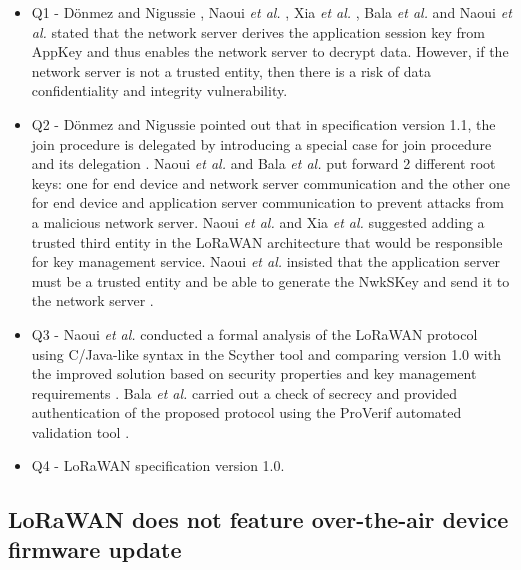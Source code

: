 \documentclass[manuscript,screen,review=false]{acmart}
\begin{document}
\begin{itemize}
\item Q1 - D\"onmez and Nigussie \cite{02_security_procedure_LoRaWANv1.1}, Naoui {\it et al.} \cite{35_third_party_key_management}, Xia {\it et al.} \cite{56_session_key_management}, Bala {\it et al.} \cite{90_separate_session_key_generation} and Naoui {\it et al.} \cite{98_lorawan_framework_smarthome} stated that the network server derives the application session key from AppKey and thus enables the network server to decrypt data. However, if the network server is not a trusted entity, then there is a risk of data confidentiality and integrity vulnerability.

\item Q2 - D\"onmez and Nigussie pointed out that in specification version 1.1, the join procedure is delegated by introducing a special case for join procedure and its delegation \cite{02_security_procedure_LoRaWANv1.1}. Naoui {\it et al.} \cite{35_third_party_key_management} and Bala {\it et al.} \cite{90_separate_session_key_generation} put forward 2 different root keys: one for end device and network server communication and the other one for end device and application server communication to prevent attacks from a malicious network server. Naoui {\it et al.} \cite{35_third_party_key_management} and Xia {\it et al.} \cite{56_session_key_management} suggested adding a trusted third entity in the LoRaWAN architecture that would be responsible for key management service. Naoui {\it et al.} insisted that the application server must be a trusted entity and be able to generate the NwkSKey and send it to the network server \cite{98_lorawan_framework_smarthome}.

\item Q3 - Naoui {\it et al.} conducted a formal analysis of the LoRaWAN protocol using C/Java-like syntax in the Scyther tool and comparing version 1.0 with the improved solution based on security properties and key management requirements \cite{35_third_party_key_management}. Bala {\it et al.} carried out a check of secrecy and provided authentication of the proposed protocol using the ProVerif automated validation tool \cite{90_separate_session_key_generation} .

\item Q4 - LoRaWAN specification version 1.0.
\end{itemize}

\subsection{LoRaWAN does not feature over-the-air device firmware update}
\end{document}

